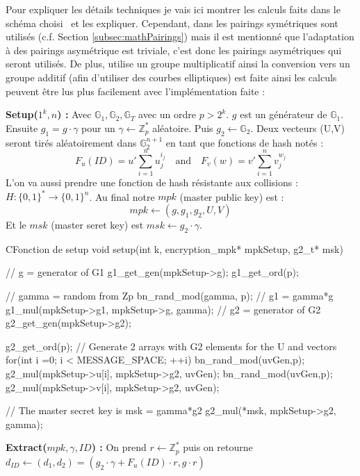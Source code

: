 Pour expliquer les détails techniques je vais ici montrer les calculs faits dans le schéma choisi~\cite{DBLP:conf/pkc/DentLP08} et les expliquer. Cependant, dans \cite{DBLP:conf/pkc/DentLP08} les pairings symétriques sont utilisés (c.f. Section \ref{subsec:mathPairings}) mais il est mentionné que l'adaptation à des pairings asymétrique est triviale, c'est donc les pairings asymétriques qui seront utilisés. De plus, \cite{DBLP:conf/pkc/DentLP08} utilise un groupe multiplicatif ainsi la conversion vers un groupe additif (afin d'utiliser des courbes elliptiques) est faite ainsi les calculs peuvent être lus plus facilement avec l'implémentation faite :

\textbf{Setup($1^k, n$) :} Avec $\mathbb{G}_1, \mathbb{G}_2, \mathbb{G}_T$ avec un ordre $p > 2^k$. $g$ est un générateur de $\mathbb{G}_1$. Ensuite  $g_1 = g \cdot \gamma$ pour un $\gamma \leftarrow  \mathbb{Z}_p^*$ aléatoire. Puis $g_2 \leftarrow \mathbb{G}_2$. Deux vecteurs (U,V) seront tirés aléatoirement dans $\mathbb{G}_2^{n+1}$ en tant que fonctions de hash notés :
\[F_u(ID) = u' \sum_{i=1}^{n} u_j^{i_j}\quad\mathrm{and}\quad F_v(w) = v' \sum_{i=1}^{n} v_j^{w_j}\]
L'on va aussi prendre une fonction de hash résistante aux collisions : $H : \{0,1\}^* \rightarrow \{0,1\}^n$. Au final notre $mpk$ (master public key) est :
\[mpk \leftarrow (g, g_1, g_2, U, V)\]
Et le $msk$ (master seret key) est $msk \leftarrow g_2 \cdot \gamma$.

\begin{sourcebox}{C}{Fonction de setup}
	void setup(int k, encryption_mpk* mpkSetup, g2_t* msk){
		// g = generator of G1
		g1_get_gen(mpkSetup->g);
		g1_get_ord(p);
		
		// gamma = random from Zp
		bn_rand_mod(gamma, p);
		// g1 = gamma*g
		g1_mul(mpkSetup->g1, mpkSetup->g, gamma);
		// g2 = generator of G2
		g2_get_gen(mpkSetup->g2);
		
		g2_get_ord(p);
		// Generate 2 arrays with G2 elements for the U and  vectors
		for(int i =0; i < MESSAGE_SPACE; ++i){
			bn_rand_mod(uvGen,p);
			g2_mul(mpkSetup->u[i], mpkSetup->g2, uvGen);
			bn_rand_mod(uvGen,p);
			g2_mul(mpkSetup->v[i], mpkSetup->g2, uvGen);
		}
		
		// The master secret key is msk = gamma*g2
		g2_mul(*msk, mpkSetup->g2, gamma);
	}
\end{sourcebox}

\textbf{Extract($mpk, \gamma, ID$) :} On prend $r \leftarrow \mathbb{Z}_p^*$ puis on retourne $d_{ID} \leftarrow (d_1, d_2) = (g_2 \cdot \gamma + F_u(ID) \cdot r, g \cdot r)$


